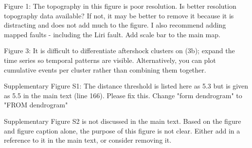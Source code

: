 \documentclass[10pt]{extarticle}
\begin{document}
\begin{Answer}
 \WorkInProgressRevTask
\end{Answer}
%
%




\begin{ReviewerComment}{1}
\noindent 
Figure 1: The topography in this figure is poor resolution. Is better resolution topography data available? If not, it may be better to remove it because it is distracting and does not add much to the figure. I also recommend adding mapped faults - including the Liri fault. Add scale bar to the main map.

\end{ReviewerComment}


\begin{Answer}
 \WorkInProgressRevTask
\end{Answer}
%
%



\begin{ReviewerComment}{1}
\noindent 
Figure 3: It is difficult to differentiate aftershock clusters on (3b); expand the time series so temporal patterns are visible. Alternatively, you can plot cumulative events per cluster rather than combining them together.  

\end{ReviewerComment}


\begin{Answer}
 \WorkInProgressRevTask
\end{Answer}
%
%



\begin{ReviewerComment}{1}
\noindent 
Supplementary Figure S1: The distance threshold is listed here as 5.3 but is given as 5.5 in the main text (line 166). Please fix this. Change "form dendrogram" to "FROM dendrogram"

\end{ReviewerComment}


\begin{Answer}
 \WorkInProgressRevTask
\end{Answer}
%
%



\begin{ReviewerComment}{1}
\noindent 
Supplementary Figure S2 is not discussed in the main text. Based on the figure and figure caption alone, the purpose of this figure is not clear. Either add in a reference to it in the main text, or consider removing it.

\end{ReviewerComment}
\end{document}

